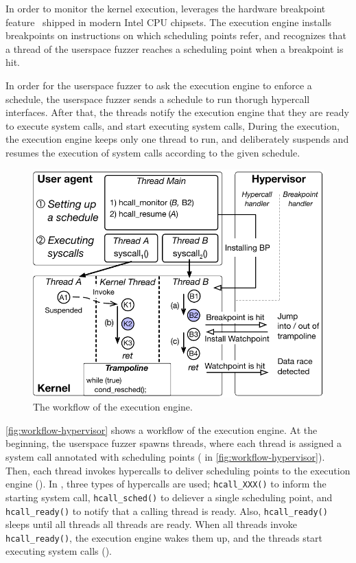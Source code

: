In order to monitor the kernel execution, \sys leverages the hardware
breakpoint feature~\cite{hwbp} shipped in modern Intel CPU chipsets.
%
The execution engine installs breakpoints on instructions on which
scheduling points refer, and recognizes that a thread of the userspace
fuzzer reaches a scheduling point when a breakpoint is hit.
%




%
In order for the userspace fuzzer to ask the execution engine to
enforce a schedule, the userspace fuzzer sends a schedule to run
thorugh hypercall interfaces.
%
After that, the threads notify the execution engine that they are
ready to execute system calls, and start executing system calls,
%
During the execution, the execution engine keeps only one thread to
run, and deliberately suspends and resumes the execution of system
calls according to the given schedule.

%
\begin{figure}[t]
  \centering
  \includegraphics[width=0.9\linewidth]{fig/workflow-hypervisor.pdf}
  \caption{The workflow of the execution engine. }
  \label{fig:workflow-hypervisor}
\end{figure}
%
\autoref{fig:workflow-hypervisor} shows a workflow of the execution
engine.
%
At the beginning, the userspace fuzzer spawns threads, where each
thread is assigned a system call annotated with scheduling points
( in \autoref{fig:workflow-hypervisor}).
%
Then, each thread invokes hypercalls to deliver scheduling points to
the execution engine (). In \sys, three types of hypercalls are
used; \texttt{hcall_XXX()} to inform the starting system call,
\texttt{hcall_sched()} to deliever a single scheduling point, and
\texttt{hcall_ready()} to notify that a calling thread is ready.
%
Also, \texttt{hcall_ready()} sleeps until all threads all threads are
ready. When all threads invoke \texttt{hcall_ready()}, the execution
engine wakes them up, and the threads start executing system calls
().

